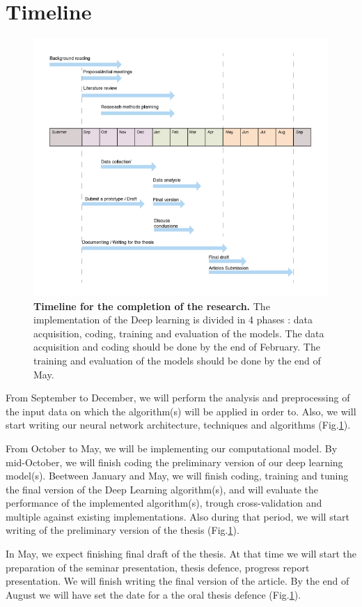 \documentclass[12pt]{article}
\begin{document}
\section{Timeline}

\begin{figure}[h]
    \centering
    \includegraphics[width=\textwidth]{figure-2.png}
    \caption{ \textbf{Timeline for the completion of the research.} The implementation of the Deep learning is divided in 4 phases : data acquisition, coding, training and evaluation of the models. The data acquisition and coding should be done by the end of February. The training and evaluation of the models should be done by the end of May.}
    \label{fig:plan}
\end{figure}

From September to December, we will perform the analysis and preprocessing of the input data on which the algorithm(s) will be applied in order to. Also, we will start writing our neural network architecture, techniques and algorithms (Fig.\ref{fig:plan}). 

From October to May, we will be implementing our computational model. By mid-October, we will finish coding the preliminary version of our deep learning model(s). Beetween January and May, we will finish coding, training and tuning the final version of the Deep Learning algorithm(s), and will evaluate the performance of the implemented algorithm(s), trough cross-validation and multiple against existing implementations. Also during that period, we will start writing of the preliminary version of the thesis (Fig.\ref{fig:plan}).

In May, we expect finishing final draft of the thesis. At that time we will start the preparation of the seminar presentation, thesis defence, progress report presentation. We will finish writing the final version of the article. By the end of August we will have set the date for a the oral thesis defence (Fig.\ref{fig:plan}). 

\printbibliography[title={Bibliography},nottype=misc,resetnumbers=true]
\end{document}
